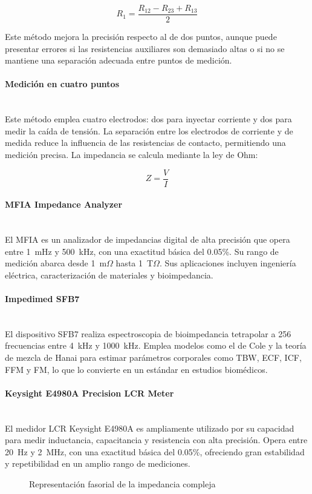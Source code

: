 \documentclass[11pt,a4paper]{article}
\newcommand{\myparagraph}[1]{\paragraph{#1}\mbox{}\\}
\begin{document}
\[
R_1 = \frac{R_{12} - R_{23} + R_{13}}{2}
\]

Este método mejora la precisión respecto al de dos puntos, aunque puede presentar errores si las resistencias auxiliares son demasiado altas o si no se mantiene una separación adecuada entre puntos de medición.

\myparagraph{Medición en cuatro puntos}

Este método emplea cuatro electrodos: dos para inyectar corriente y dos para medir la caída de tensión. La separación entre los electrodos de corriente y de medida reduce la influencia de las resistencias de contacto, permitiendo una medición precisa. La impedancia se calcula mediante la ley de Ohm:

\[
Z = \frac{V}{I}
\]

\myparagraph{MFIA Impedance Analyzer}

El MFIA es un analizador de impedancias digital de alta precisión que opera entre 1~mHz y 500~kHz, con una exactitud básica del 0.05\%. Su rango de medición abarca desde 1~m\(\Omega\) hasta 1~T\(\Omega\). Sus aplicaciones incluyen ingeniería eléctrica, caracterización de materiales y bioimpedancia.

\myparagraph{Impedimed SFB7}

El dispositivo SFB7 realiza espectroscopia de bioimpedancia tetrapolar a 256 frecuencias entre 4~kHz y 1000~kHz. Emplea modelos como el de Cole y la teoría de mezcla de Hanai para estimar parámetros corporales como TBW, ECF, ICF, FFM y FM, lo que lo convierte en un estándar en estudios biomédicos.

\myparagraph{Keysight E4980A Precision LCR Meter}

El medidor LCR Keysight E4980A es ampliamente utilizado por su capacidad para medir inductancia, capacitancia y resistencia con alta precisión. Opera entre 20~Hz y 2~MHz, con una exactitud básica del 0.05\%, ofreciendo gran estabilidad y repetibilidad en un amplio rango de mediciones.

\begin{figure}[H]
\centering

\shorthandoff{<>}


\shorthandon{<>}

\caption{Representación fasorial de la impedancia compleja}
\label{fig:fasor}
\end{figure}
\end{document}
